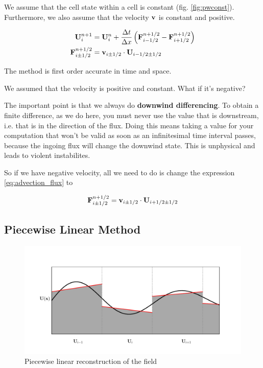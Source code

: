 We assume that the cell state within a cell is constant (fig. \ref{fig:pwconst}).
Furthermore, we also assume that the velocity $\mathbf{v}$ is constant and positive.


\begin{align}
	\mathbf{U}_i ^{n+1} &= 
		\mathbf{U}_i^{n} +  \frac{\Delta t}{\Delta x} \left( \mathbf{F}_{i-1/2}^{n+1/2} - \mathbf{F}_{i+1/2}^{n+1/2} \right) \label{eq:advection_basic}\\ 
	\mathbf{F}_{i\pm1/2}^{n+1/2} &= \mathbf{v}_{i\pm1/2}\cdot \mathbf{U}_{i - 1/2 \pm 1/2} \label{eq:advection_flux}
\end{align}

The method is first order accurate in time and space.





We assumed that the velocity is positive and constant.
What if it's negative?

The important point is that we always do \textbf{downwind differencing}.
To obtain a finite difference, as we do here, you must never use the value that is downstream, i.e. that is in the direction of the flux.
Doing this means taking a value for your computation that won't be valid as soon as an infinitesimal time interval passes, because the ingoing flux will change the downwind state.
This is unphysical and leads to violent instabilites.

So if we have negative velocity, all we need to do is change the expression \ref{eq:advection_flux} to

\begin{equation}
	\mathbf{F}_{i\pm1/2}^{n+1/2} = \mathbf{v}_{i\pm1/2}\cdot \mathbf{U}_{i + 1/2 \pm 1/2}
\end{equation}









\subsection{Piecewise Linear Method}

\begin{figure}[htbp]
	\includegraphics[width=\textwidth]{./figures/piecewise_linear.pdf}%
	\caption{Piecewise linear reconstruction of the field
		\label{fig:pwlin}
	}
\end{figure}




